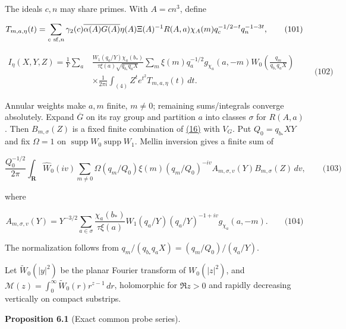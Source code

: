 The ideals \(c,n\) may share primes. With \(A=cn^3\), define

\hypertarget{cf:eq:2.3}{}

\label{cf:eq:2.3}

\[
T_{m,a,\eta}(t)=\sum_{c\ {\rm sf},n}
 \gamma_2(c)\overline{\alpha(A)G(A)}\eta(A)\Xi(A)^{-1}R(A,a)
 \chi_A(m)q_c^{-1/2-t}q_n^{-1-3t},
\qquad\text{(101)}
\]

\hypertarget{cf:eq:2.4}{}

\label{cf:eq:2.4}

\[
\begin{aligned}
 I_\eta(X,Y,Z)=\frac1Y\sum_a
 &\frac{W_1(q_a/Y)\chi_a(b_*)}{\tau\xi(a)\sqrt{q_{b_*}q_aX}}
 \sum_m\xi(m)q_a^{-1/2}g_{\chi_a}(a,-m)
 W_0\!\left(\frac{q_m}{q_{b_*}q_aX}\right)\\
 &\times\frac1{2\pi i}\int_{(4)}Z^te^{t^2}T_{m,a,\eta}(t)\,dt.
\end{aligned}
\qquad\text{(102)}
\]

Annular weights make \(a,m\) finite, \(m\ne0\); remaining sums/integrals converge absolutely. Expand \(\overline G\) on its ray group and partition \(a\) into classes \(\sigma\) for \(R(A,a)\). Then \(B_{m,\sigma}(Z)\) is a fixed finite combination of \protect\hyperlink{cf:completed-definition}{(16)} with \(V_G\). Put \(Q_0=q_{b_*}XY\) and fix \(\Omega=1\) on \(\operatorname{supp}W_0\operatorname{supp}W_1\). Mellin inversion gives a finite sum of

\hypertarget{cf:eq:2.6}{}

\label{cf:eq:2.6}

\[
\frac{Q_0^{-1/2}}{2\pi}\int_{\mathbf R}\widehat W_0(iv)
 \sum_{m\ne0}\Omega(q_m/Q_0)\xi(m)(q_m/Q_0)^{-iv}
 A_{m,\sigma,v}(Y)B_{m,\sigma}(Z)\,dv,
\qquad\text{(103)}
\]

where

\hypertarget{cf:eq:2.7}{}

\label{cf:eq:2.7}

\[
A_{m,\sigma,v}(Y)=Y^{-3/2}\sum_{a\in\sigma}
 \frac{\chi_a(b_*)}{\tau\xi(a)}W_1(q_a/Y)(q_a/Y)^{-1+iv}g_{\chi_a}(a,-m).
\qquad\text{(104)}
\]

The normalization follows from \(q_m/(q_{b_*}q_aX)=(q_m/Q_0)/(q_a/Y)\).

Let \(\widetilde W_0(|y|^2)\) be the planar Fourier transform of \(W_0(|z|^2)\), and \(\mathcal M(z)=\int_0^\infty\widetilde W_0(r)r^{z-1}\,dr\), holomorphic for \(\Re z>0\) and rapidly decreasing vertically on compact substrips.

\textbf{Proposition 6.1} (Exact common probe series). \hypertarget{cf:exact-probe-series}{}\label{cf:exact-probe-series}

